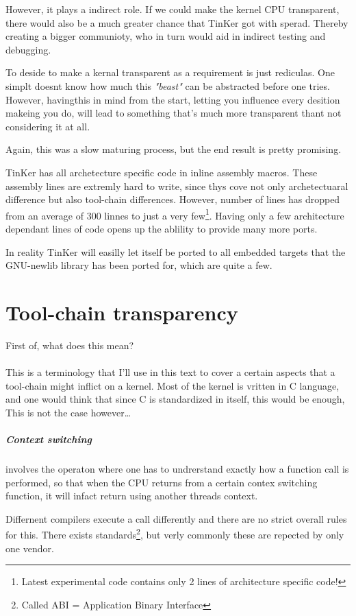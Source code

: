 However, it plays a indirect role. If we could make the kernel CPU transparent, there would also be a much greater chance that TinKer got with sperad. Thereby creating a bigger communioty, who in turn would aid in indirect testing and debugging.

To deside to make a kernal transparent as a requirement is just rediculas. One simplt doesnt know how much this \textit{"beast"} can be abstracted before one tries. However, havingthis in mind from the start, letting you influence every desition makeing you do, will lead to something that's much more transparent thant not considering it at all.

Again, this was a slow maturing process, but the end result is pretty promising. 

TinKer has all archetecture specific code in inline assembly macros. These assembly lines are extremly hard to write, since thys cove not only archetectuaral difference but also tool-chain differences. However, number of lines has dropped from an average of 300 linnes to just a very few\footnote{Latest experimental code contains only 2 lines of architecture specific code!}. Having only a few architecture dependant lines of code opens up the ablility to provide many more ports.

In reality TinKer will easilly let itself be ported to all embedded targets that the GNU-newlib library has been ported for, which are quite a few.

\chapter{Tool-chain transparency}
First of, what does this mean?
\\\\
This is a terminology that I'll use in this text to cover a certain aspects that a tool-chain might inflict on a kernel. Most of the kernel is vritten in C language, and one would think that since C is standardized in itself, this would be enough, This is not the case however\ldots

\paragraph{Context switching} involves the operaton where one has to undrerstand exactly how a function call is performed, so that when the CPU returns from a certain contex switching function, it will infact return using another threads context.

Differnent compilers execute a call differently and there are no strict overall rules for this. There exists standards\footnote{Called ABI = Application Binary Interface}, but verly commonly these are repected by only one vendor.

